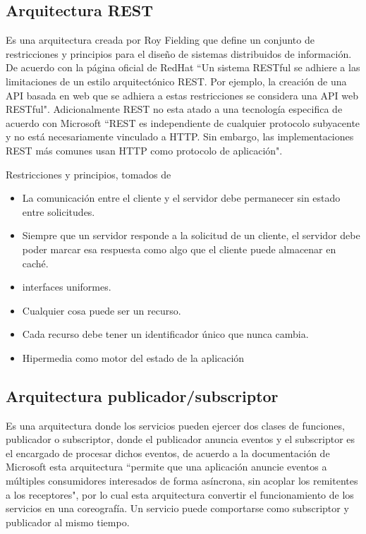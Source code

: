 \subsection{Arquitectura REST}

Es una arquitectura creada por Roy Fielding que define un conjunto de restricciones y principios para el diseño de sistemas distribuidos de información. De acuerdo con la página oficial de RedHat \cite{redHatREST} ``Un sistema RESTful se adhiere a las limitaciones de un estilo arquitectónico REST. Por ejemplo, la creación de una API basada en web que se adhiera a estas restricciones se considera una API web RESTful". Adicionalmente REST no esta atado a una tecnología especifica de acuerdo con Microsoft \cite{microsoftREST} ``REST es independiente de cualquier protocolo subyacente y no está necesariamente vinculado a HTTP. Sin embargo, las implementaciones REST más comunes usan HTTP como protocolo de aplicación".

Restricciones y principios, tomados de \cite{redHatREST}
\begin{itemize}
    \item La comunicación entre el cliente y el servidor debe permanecer sin estado entre solicitudes.
    \item Siempre que un servidor responde a la solicitud de un cliente, el servidor debe poder marcar esa respuesta como algo que el cliente puede almacenar en caché.
    \item interfaces uniformes.
    \item Cualquier cosa puede ser un recurso.
    \item Cada recurso debe tener un identificador único que nunca cambia.
    \item Hipermedia como motor del estado de la aplicación
\end{itemize}


\subsection{Arquitectura publicador/subscriptor}

Es una arquitectura donde los servicios pueden ejercer dos clases de funciones, publicador o subscriptor, donde el publicador anuncia eventos y el subscriptor es el encargado de procesar dichos eventos, de acuerdo a la documentación de Microsoft \cite{microsftPub/Sub} esta arquitectura ``permite que una aplicación anuncie eventos a múltiples consumidores interesados de forma asíncrona, sin acoplar los remitentes a los receptores", por lo cual esta arquitectura convertir el funcionamiento de los servicios en una coreografía. Un servicio puede comportarse como subscriptor y publicador al mismo tiempo.

